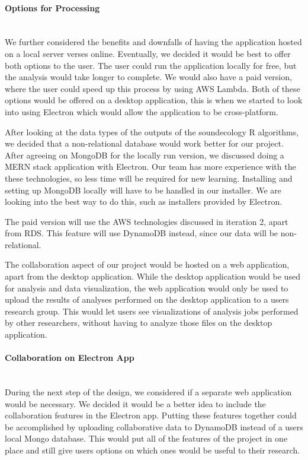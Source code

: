 \paragraph{Options for Processing} \mbox{}\\[\paragraphheaderspace]
We further considered the benefits and downfalls of having the application hosted on a local server verses online. Eventually, we decided it would be best to offer both options to the user. The user could run the application locally for free, but the analysis would take longer to complete. We would also have a paid version, where the user could speed up this process by using AWS Lambda. Both of these options would be offered on a desktop application, this is when we started to look into using Electron which would allow the application to be cross-platform.\par
After looking at the data types of the outputs of the soundecology R algorithms, we decided that a non-relational database would work better for our project. After agreeing on MongoDB for the locally run version, we discussed doing a MERN stack application with Electron. Our team has more experience with the these technologies, so less time will be required for new learning. Installing and setting up MongoDB locally will have to be handled in our installer. We are looking into the best way to do this, such as installers provided by Electron.\par
The paid version will use the AWS technologies discussed in iteration 2, apart from RDS. This feature will use DynamoDB instead, since our data will be non-relational.\par
The collaboration aspect of our project would be hosted on a web application, apart from the desktop application. While the desktop application would be used for analysis and data visualization, the web application would only be used to upload the results of analyses performed on the desktop application to a user\textquotesingle s research group. This would let users see visualizations of analysis jobs performed by other researchers, without having to analyze those files on the desktop application.\par

\paragraph{Collaboration on Electron App} \mbox{}\\[\paragraphheaderspace]
During the next step of the design, we considered if a separate web application would be necessary. We decided it would be a better idea to include the collaboration features in the Electron app. Putting these features together could be accomplished by uploading collaborative data to DynamoDB instead of a user\textquotesingle s local Mongo database. This would put all of the features of the project in one place and still give users options on which ones would be useful to their research.\par

